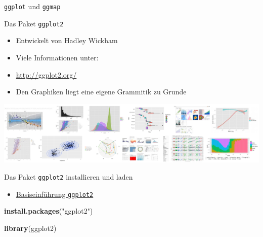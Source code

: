 \documentclass[ignorenonframetext,]{beamer}
\newenvironment{Shaded}{}{}
\newcommand{\KeywordTok}[1]{\textcolor[rgb]{0.00,0.44,0.13}{\textbf{{#1}}}}
\newcommand{\StringTok}[1]{\textcolor[rgb]{0.25,0.44,0.63}{{#1}}}
\newcommand{\NormalTok}[1]{{#1}}
\providecommand{\tightlist}{%
\setlength{\itemsep}{0pt}\setlength{\parskip}{0pt}}
\begin{document}
\begin{frame}{\texttt{ggplot} und \texttt{ggmap}}

\end{frame}

\begin{frame}{Das Paket \texttt{ggplot2}}

\begin{itemize}
\tightlist
\item
  Entwickelt von Hadley Wickham
\item
  Viele Informationen unter:
\item
  \url{http://ggplot2.org/}
\item
  Den Graphiken liegt eine eigene Grammitik zu Grunde
\end{itemize}

\includegraphics{./tex2pdf.956/7e98fbfb3ac587a4e38146cb5b5e6d7fba26965d.png}

\end{frame}

\begin{frame}[fragile]{Das Paket \texttt{ggplot2} installieren und
laden}

\begin{itemize}
\tightlist
\item
  \href{www.r-bloggers.com/basic-introduction-to-ggplot2/}{Basiseinführung
  \texttt{ggplot2}}
\end{itemize}

\begin{Shaded}
\begin{Highlighting}[]
\KeywordTok{install.packages}\NormalTok{(}\StringTok{"ggplot2"}\NormalTok{)}
\end{Highlighting}
\end{Shaded}

\begin{Shaded}
\begin{Highlighting}[]
\KeywordTok{library}\NormalTok{(ggplot2)}
\end{Highlighting}
\end{Shaded}

\end{frame}
\end{document}
